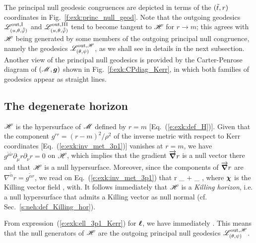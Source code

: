 The principal null geodesic congruences are depicted in terms of the $({\tilde t}, r)$
coordinates in Fig.~\ref{f:exk:princ_null_geod}. Note that the outgoing geodesics
$\mathscr{L}^{\rm out, I}_{(u,\theta,\tilde{{\tilde\varphi}})}$ and $\mathscr{L}^{\rm out, III}_{(u,\theta,\tilde{{\tilde\varphi}})}$
tend to become tangent to $\mathscr{H}$ for $r\to m$; this agrees with $\mathscr{H}$ being
generated by some members of the outgoing principal null congruence, namely the geodesics
$\mathscr{L}^{{\rm out},\mathscr{H}}_{(\theta,\psi)}$, as we shall see in details in the next subsection.
Another view of the principal null geodesics is provided by the Carter-Penrose
diagram of $(\mathscr{M},\bm{g})$ shown in Fig.~\ref{f:exk:CPdiag_Kerr}, in which both
families of geodesics appear as straight lines.

\subsection{The degenerate horizon} \label{s:exk:horizon}

$\mathscr{H}$ is the hypersurface of $\mathscr{M}$ defined by $r=m$ [Eq.~(\ref{e:exk:def_H})]. Given
that the component $g^{rr} = (r - m)^2/\rho^2$ of the inverse metric with respect to Kerr coordinates
[Eq.~(\ref{e:exk:inv_met_3p1})] vanishes at $r=m$, we have
$g^{\tilde{\mu}\tilde{\nu}} \partial_{\tilde{\mu}} r \partial_{\tilde{\nu}} r = 0$ on $\mathscr{H}$,
which implies that the gradient $\overrightarrow{\bm{\nabla}} r$
is a null vector there and that $\mathscr{H}$ is a null hypersurface.
Moreover, since the components of $\overrightarrow{\bm{\nabla}} r$ are $\nabla^{\tilde{\alpha}} r = g^{\tilde{\alpha}r}$,
we read on Eq.~(\ref{e:exk:inv_met_3p1}) that
\be
    \vw{\nabla} r \equalH {} \wpar_{\ti} +  \wpar_{\tph}
        \equalH {} \w{\chi} ,
\ee
where $\bm{\chi}$ is the Killing vector field
\be \label{e:exk:def_chi}
    \encadre{\w{\chi} := \w{\xi} + \Omega_{\Hor} \w{\eta} },
    \qquad\mbox{with}\quad {}.
\ee
It follows immediately that $\mathscr{H}$ is a \emph{Killing horizon}, i.e. a null hypersurface
that admits a Killing vector as null normal (cf. Sec.~\ref{s:neh:def_Killing_hor}).

From expression~(\ref{e:exk:ell_3p1_Kerr}) for $\bm{\ell}$, we have immediately
\be \label{e:exk:ell_chi_on_H}
    \wl \equalH \w{\chi} .
\ee
This means that the null generators of $\mathscr{H}$ are the outgoing principal null
geodesics $\mathscr{L}^{{\rm out},\mathscr{H}}_{(\theta,\psi)}$.

